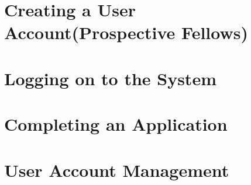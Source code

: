 \documentclass[12pt]{article}
\begin{document}
\section{Creating a User Account(Prospective Fellows)}

\section{Logging on to the System}

\section{Completing an Application}

\section{User Account Management}
\end{document}

